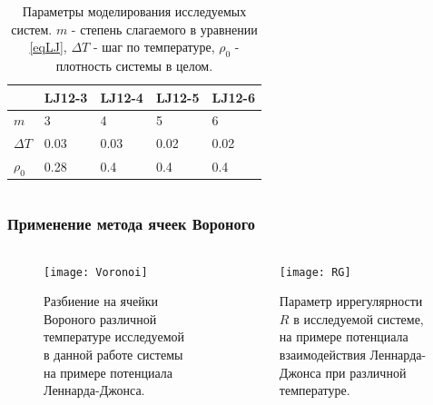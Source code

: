 \documentclass[pdf,hyperref={unicode}]{beamer}
\begin{document}
\begin{frame}
\begin{columns}
\begin{column}{0.5\linewidth}
{\begin{table}[H]
\begin{center}
\begin{tabular}{| l | l | l | l | l |}
\hline
    & LJ12-3 & LJ12-4 & LJ12-5 & LJ12-6 \\ \hline
$m$   &    3    &     4   &    5    &    6    \\ \hline
$\Delta T$ & 0.03 & 0.03 & 0.02 & 0.02 \\ \hline
$\rho_0$ & 0.28  &  0.4  &  0.4  &  0.4  \\ \hline
\end{tabular}
\end{center}
\caption{\tiny Параметры моделирования исследуемых систем. $m$ - степень слагаемого в уравнении \ref{eqLJ}, $\Delta T$ - шаг по температуре,  $\rho_0$ - плотность системы в целом.}
\label{tablParam}
\end{table}

}
\end{column}

\end{columns}
\end{frame}





\begin{frame}
\transdissolve[duration=0.2]
\frametitle{Применение метода ячеек Вороного}
\begin{columns}


\begin{column}{0.54\linewidth}
{
\begin{figure}[h]
\begin{center}
\texttt{[image: Voronoi]}
\caption{\tiny Разбиение на ячейки Вороного различной температуре исследуемой в данной работе системы на примере потенциала Леннарда-Джонса.}
\label{risvoronoiExp}
\end{center}
\end{figure}
}
\end{column}

\begin{column}{0.6\linewidth}
{
\begin{figure}[h]
\begin{center}
\texttt{[image: RG]}
\caption{\tiny Параметр иррегулярности $R$ в исследуемой системе, на примере потенциала взаимодействия Леннарда-Джонса при различной температуре.}
\label{risIregExp}
\end{center}
\end{figure}
}
\end{column}

\end{columns}
\end{frame}
\end{document}
